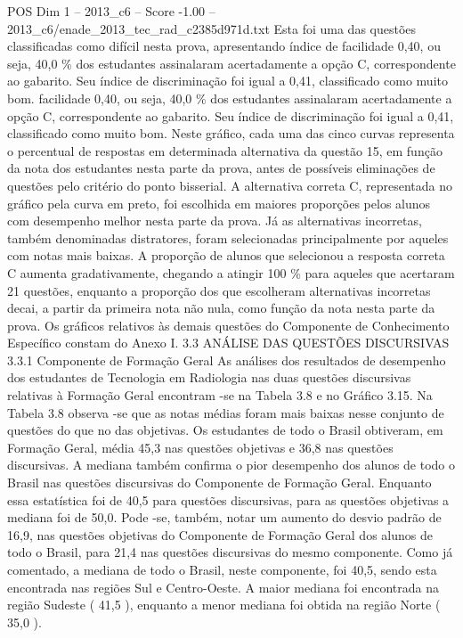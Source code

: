 \begin{textsample}{POS Dim 1 – 2013\_c6 – Score -1.00 – 2013\_c6/enade\_2013\_tec\_rad\_c2385d971d.txt}
Esta foi uma das questões classificadas como difícil nesta prova, apresentando índice de facilidade 0,40, ou seja, 40,0 \% dos estudantes assinalaram acertadamente a opção C, correspondente ao gabarito.
Seu índice de discriminação foi igual a 0,41, classificado como muito bom. facilidade 0,40, ou seja, 40,0 \% dos estudantes assinalaram acertadamente a opção C, correspondente ao gabarito.
Seu índice de discriminação foi igual a 0,41, classificado como muito bom.
Neste gráfico, cada uma das cinco curvas representa o percentual de respostas em determinada alternativa da questão 15, em função da nota dos estudantes nesta parte da prova, antes de possíveis eliminações de questões pelo critério do ponto bisserial.
A alternativa correta C, representada no gráfico pela curva em preto, foi escolhida em maiores proporções pelos alunos com desempenho melhor nesta parte da prova.
Já as alternativas incorretas, também denominadas distratores, foram selecionadas principalmente por aqueles com notas mais baixas.
A proporção de alunos que selecionou a resposta correta C aumenta gradativamente, chegando a atingir 100 \% para aqueles que acertaram 21 questões, enquanto a proporção dos que escolheram alternativas incorretas decai, a partir da primeira nota não nula, como função da nota nesta parte da prova.
Os gráficos relativos às demais questões do Componente de Conhecimento Específico constam do Anexo I. 3.3 ANÁLISE DAS QUESTÕES DISCURSIVAS 3.3.1 Componente de Formação Geral As análises dos resultados de desempenho dos estudantes de Tecnologia em Radiologia nas duas questões discursivas relativas à Formação Geral encontram -se na Tabela 3.8 e no Gráfico 3.15.
Na Tabela 3.8 observa -se que as notas médias foram mais baixas nesse conjunto de questões do que no das objetivas.
Os estudantes de todo o Brasil obtiveram, em Formação Geral, média 45,3 nas questões objetivas e 36,8 nas questões discursivas.
A mediana também confirma o pior desempenho dos alunos de todo o Brasil nas questões discursivas do Componente de Formação Geral.
Enquanto essa estatística foi de 40,5 para questões discursivas, para as questões objetivas a mediana foi de 50,0.
Pode -se, também, notar um aumento do desvio padrão de 16,9, nas questões objetivas do Componente de Formação Geral dos alunos de todo o Brasil, para 21,4 nas questões discursivas do mesmo componente.
Como já comentado, a mediana de todo o Brasil, neste componente, foi 40,5, sendo esta encontrada nas regiões Sul e Centro-Oeste.
A maior mediana foi encontrada na região Sudeste ( 41,5 ), enquanto a menor mediana foi obtida na região Norte ( 35,0 ).

\end{textsample}
